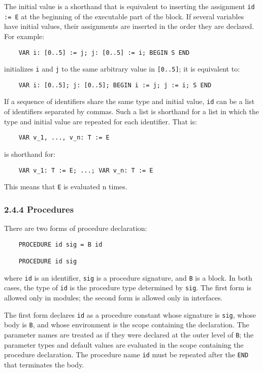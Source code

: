 \documentclass[10pt]{article}
\begin{document}
The initial value is a shorthand that is equivalent to inserting the
assignment \verb|id := E| at the beginning of the executable part of the
block.  If several variables have initial values, their assignments are
inserted in the order they are declared.  For example:
\begin{verbatim}
    VAR i: [0..5] := j; j: [0..5] := i; BEGIN S END
\end{verbatim}
initializes \verb|i| and \verb|j| to the same arbitrary value in
\verb|[0..5]|; it is equivalent to:
\begin{verbatim}
    VAR i: [0..5]; j: [0..5]; BEGIN i := j; j := i; S END
\end{verbatim}

If a sequence of identifiers share the same type and initial value, \verb|id|
can be a list of identifiers separated by commas.  Such a list is shorthand
for a list in which the type and initial value are repeated for each
identifier.  That is:
\begin{verbatim}
    VAR v_1, ..., v_n: T := E
\end{verbatim}
is shorthand for:
\begin{verbatim}
    VAR v_1: T := E; ...; VAR v_n: T := E
\end{verbatim}
This means that \verb|E| is evaluated n times.

\subsubsection*{2.4.4 Procedures}

There are two forms of procedure declaration:
\begin{verbatim}
    PROCEDURE id sig = B id

    PROCEDURE id sig
\end{verbatim}
where \verb|id| is an identifier, \verb|sig| is a procedure signature, and
\verb|B| is a block.  In both cases, the type of \verb|id| is the procedure
type determined by \verb|sig|.  The first form is allowed only in modules; the
second form is allowed only in interfaces.

The first form declares \verb|id| as a procedure constant whose signature is
\verb|sig|, whose body is \verb|B|, and whose environment is the scope
containing the declaration.  The parameter names are treated as if they were
declared at the outer level of \verb|B|; the parameter types and default
values are evaluated in the scope containing the procedure declaration.  The
procedure name \verb|id| must be repeated after the \verb|END| that terminates
the body.
\end{document}
